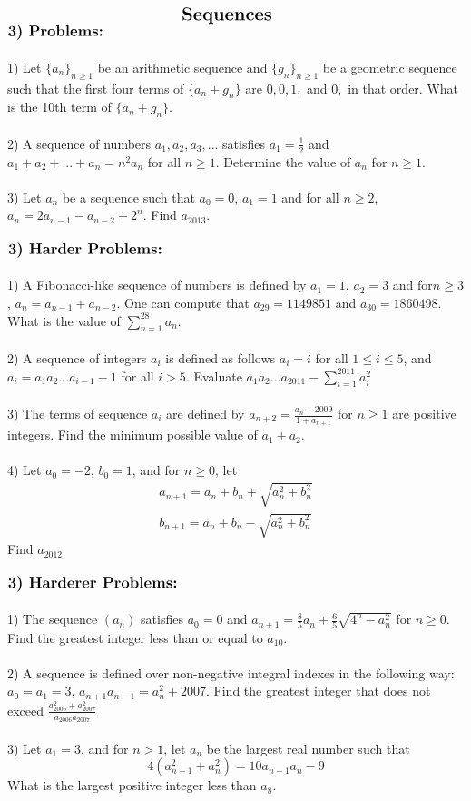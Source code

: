 \documentclass{article}
\begin{document}
$\centerline{\Large \textbf{Sequences}}$
\\
$\large \textbf{3) Problems:}$  \\
\\
1) Let $\{ a_n\}_{n\ge 1}$ be an arithmetic sequence and $\{ g_n\}_{n\ge 1}$ be a geometric sequence such that the first four terms of $\{a_n+g_n\}$ are $0,0,1,$ and $0,$ in that order. What is the 10th term of $\{a_n+g_n\}$.
\\
\\
2) A sequence of numbers $a_1,a_2,a_3,...$ satisfies $a_1=\frac{1}{2}$ and $a_1+a_2+...+a_n=n^2a_n$ for all $n\ge 1$. Determine the value of $a_n$ for $n\ge 1$.
\\
\\
3) Let $a_n$ be a sequence such that $a_0=0$, $a_1=1$ and for all $n\ge 2$,\\ $a_n=2a_{n-1}-a_{n-2}+2^n$. Find $a_{2013}$.
\\
\\
$\large \textbf{3) Harder Problems:}$  \\
\\
1) A Fibonacci-like sequence of numbers is defined by $a_1=1$, $a_2=3$ and for$n\ge 3$, $a_n=a_{n-1}+a_{n-2}$. One can compute that $a_{29}=1149851$ and $a_{30}=1860498.$ What is the value of $\sum_{n=1}^{28} a_n$.
\\
\\
2) A sequence of integers ${a_i}$ is defined as follows $a_i=i$ for all $1\le i\le 5$, and $a_i=a_1a_2...a_{i-1}-1$ for all $i>5$. Evaluate $a_1a_2...a_{2011}-\sum_{i=1}^{2011} a_i^2$
\\
\\
3) The terms of sequence ${a_i}$ are defined by $a_{n+2}=\frac{a_n+2009}{1+a_{n+1}}$ for $n\ge 1$ are positive integers. Find the minimum possible value of $a_1+a_2$.
\\
\\
4) Let $a_0=-2$, $b_0=1$, and for $n\ge 0$, let
\begin{align*}
a_{n+1}=a_n+b_n+\sqrt{a_n^2+b_n^2}\\
b_{n+1}=a_n+b_n-\sqrt{a_n^2+b_n^2}
\end{align*}
Find $a_{2012}$
\\
\\
$\large \textbf{3) Harderer Problems:}$  \\
\\
1) The sequence $(a_n)$ satisfies $a_0=0$ and $a_{n+1}=\frac{8}{5}a_n+\frac{6}{5}\sqrt{4^n-a_n^2}$ for $n\ge 0$. Find the greatest integer less than or equal to $a_{10}$.
\\
\\
2) A sequence is defined over non-negative integral indexes in the following way: $a_0=a_1=3$, $a_{n+1}a_{n-1}=a_n^2+2007$. Find the greatest integer that does not exceed $\frac{a_{2006}^2+a_{2007}^2}{a_{2006}a_{2007}}$
\\
\\
3) Let $a_1=3$, and for $n>1$, let $a_n$ be the largest real number such that 
\begin{equation*}
4(a_{n-1}^2+a_n^2)=10a_{n-1}a_n-9
\end{equation*}
What is the largest positive integer less than $a_8$.
\end{document}

